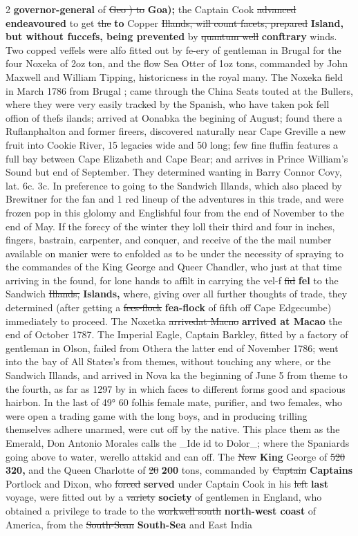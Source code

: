 \documentclass[10pt]{article}
\begin{document}
\begin{multicols}{2}
\textbf{governor-general} of \sout{Geo ) to} \textbf{Goa);} the Captain Cook \sout{advanced} \textbf{endeavoured} to get \sout{the} \textbf{to} Copper \sout{Illands, will count facets, prepared} \textbf{Island, but without fuccefs, being prevented} by \sout{quantum well} \textbf{conftrary} winds. Two copped veffels were alfo fitted out by fe-ery of gentleman in Brugal for the four Noxeka of 2oz ton, and the flow Sea Otter of 1oz tons, commanded by John Maxwell and William Tipping, historicness in the royal many. The Noxeka field in March 1786 from Brugal ; came through the China Seats touted at the Bullers, where they were very easily tracked by the Spanish, who have taken pok fell offion of thefs ilands; arrived at Oonabka the begining of August; found there a Ruflanphalton and former fireers, discovered naturally near Cape Greville a new fruit into Cookie River, 15 legacies wide and 50 long; few fine fluffin features a full bay between Cape Elizabeth and Cape Bear; and arrives in Prince William's Sound but end of September. They determined wanting in Barry Connor Covy, lat. 6c. 3c. In preference to going to the Sandwich Illands, which also placed by Brewitner for the fan and 1 red lineup of the adventures in this trade, and were frozen pop in this glolomy and Englishful four from the end of November to the end of May. If the forecy of the winter they loll their third and four in inches, fingers, bastrain, carpenter, and conquer, and receive of the the mail number available on manier were to enfolded as to be under the necessity of spraying to the commandes of the King George and Queer Chandler, who just at that time arriving in the found, for lone hands to affilt in carrying the vel-f \sout{fid} \textbf{fel} to the Sandwich \sout{Illands,} \textbf{Islands,} where, giving over all further thoughts of trade, they determined (after getting a \sout{fees-flock} \textbf{fea-flock} of fifth off Cape Edgecumbe) immediately to proceed. The Noxetka \sout{arrivedat Macno} \textbf{arrived at Macao} the end of October 1787. The Imperial Eagle, Captain Barkley, fitted by a factory of gentleman in Olson, failed from Othera the latter end of November 1786; went into the bay of All States’s from themes, without touching any where, or the Sandwich Illands, and arrived in Nova ka the beginning of June 5 from theme to the fourth, as far as 1297 by in which faces to different forms good and spacious hairbon. In the last of 49° 60 folhis female mate, purifier, and two females, who were open a trading game with the long boys, and in producing trilling themselves adhere unarmed, were cut off by the native. This place them as the Emerald, Don Antonio Morales calls the \_Ide id to Dolor\_; where the Spaniards going above to water, werello attskid and can off. The \sout{New} \textbf{King} George of \sout{520} \textbf{320,} and the Queen Charlotte of \sout{20} \textbf{200} tons, commanded by \sout{Captain} \textbf{Captains} Portlock and Dixon, who \sout{forced} \textbf{served} under Captain Cook in his \sout{left} \textbf{last} voyage, were fitted out by a \sout{variety} \textbf{society} of gentlemen in England, who obtained a privilege to trade to the \sout{workwell south} \textbf{north-west coast} of America, from the \sout{South-Sean} \textbf{South-Sea} and East India 
\end{multicols}
\end{document}
